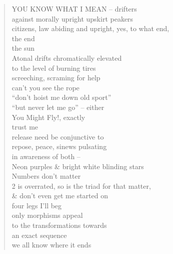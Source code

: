 \documentclass[11pt]{article}
\begin{document}
\begin{verse}
\hspace*{4em}YOU KNOW WHAT I MEAN -- drifters\\
against morally upright upskirt peakers\\
citizens, law abiding and upright, yes, to what end,\\
\hspace*{4em}the end\\
\hspace*{8em}the sun\\
\hspace*{4em}Atonal drifts chromatically elevated\\
to the level of burning tires\\
screeching, scraming for help\\
\vspace*{1em}
can't you see the rope\\
\hspace*{4em}``don't hoist me down old sport''\\
\hspace*{4em}``but never let me go'' -- either\\
You Might Fly!, exactly\\
\hspace*{4em}trust me\\
\hspace*{8em}release need be conjunctive to\\
\hspace*{4em}repose, peace, sinews pulsating\\
\hspace*{4em}in awareness of both --\\
Neon purples \& bright white blinding stars\\
\vspace*{1em}
Numbers don't matter\\
\hspace*{4em}2 is overrated, so is the triad for that matter,\\
\hspace*{4em}\& don't even get me started on\\
\hspace*{8em}four legs I'll beg\\
\hspace*{12em}only morphisms appeal\\
\hspace*{12em}to the transformations towards\\
an exact sequence\\
\hspace*{4em}we all know where it ends\\

\end{verse}
\end{document}
